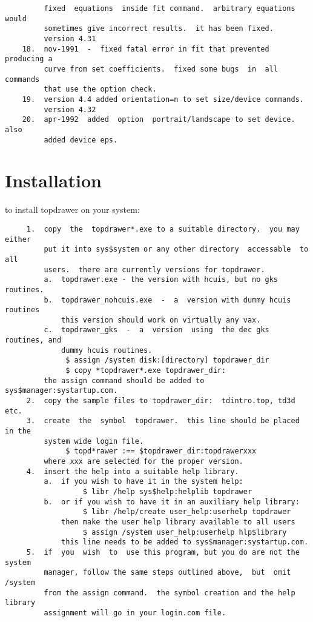 \begin{verbatim}
         fixed  equations  inside fit command.  arbitrary equations would
         sometimes give incorrect results.  it has been fixed.  
         version 4.31 
    18.  nov-1991  -  fixed fatal error in fit that prevented producing a
         curve from set coefficients.  fixed some bugs  in  all  commands
         that use the option check.  
    19.  version 4.4 added orientation=n to set size/device commands.  
         version 4.32 
    20.  apr-1992  added  option  portrait/landscape to set device.  also
         added device eps.  
\end{verbatim}
\section{Installation}
to install topdrawer on your system:  
\begin{verbatim}
     1.  copy  the  topdrawer*.exe to a suitable directory.  you may either
         put it into sys$system or any other directory  accessable  to  all
         users.  there are currently versions for topdrawer.  
         a.  topdrawer.exe - the version with hcuis, but no gks routines.  
         b.  topdrawer_nohcuis.exe  -  a  version with dummy hcuis routines
             this version should work on virtually any vax.  
         c.  topdrawer_gks  -  a  version  using  the dec gks routines, and
             dummy hcuis routines.  
              $ assign /system disk:[directory] topdrawer_dir 
              $ copy *topdrawer*.exe topdrawer_dir:  
         the assign command should be added to sys$manager:systartup.com.  
     2.  copy the sample files to topdrawer_dir:  tdintro.top, td3d etc.  
     3.  create  the  symbol  topdrawer.  this line should be placed in the
         system wide login file.  
              $ topd*rawer :== $topdrawer_dir:topdrawerxxx 
         where xxx are selected for the proper version.  
     4.  insert the help into a suitable help library.  
         a.  if you wish to have it in the system help:  
                  $ libr /help sys$help:helplib topdrawer 
         b.  or if you wish to have it in an auxiliary help library:  
                  $ libr /help/create user_help:userhelp topdrawer 
             then make the user help library available to all users 
                  $ assign /system user_help:userhelp hlp$library 
             this line needs to be added to sys$manager:systartup.com.  
     5.  if  you  wish  to  use this program, but you do are not the system
         manager, follow the same steps outlined above,  but  omit  /system
         from the assign command.  the symbol creation and the help library
         assignment will go in your login.com file.  
\end{verbatim}
